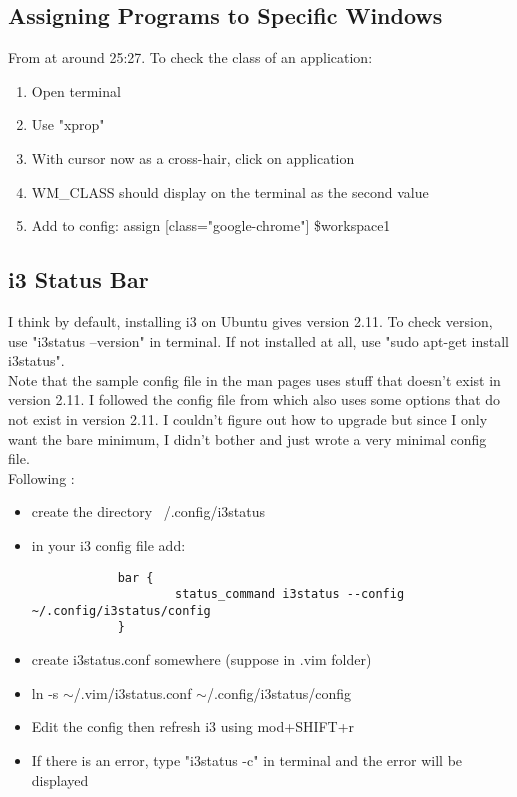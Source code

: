 \subsection{Assigning Programs to Specific Windows}
From \cite{codecast2015i3wm} at around 25:27.
To check the class of an application:
\begin{enumerate}
    \item Open terminal
    \item Use "xprop"
    \item With cursor now as a cross-hair, click on application
    \item WM\_CLASS should display on the terminal as the second value
    \item Add to config:
        assign [class="google-chrome"] \$workspace1
\end{enumerate}

\subsection{i3 Status Bar}
I think by default, installing i3 on Ubuntu gives version 2.11. To check
version, use "i3status --version" in terminal. If not installed at all, use
"sudo apt-get install i3status".\\

Note that the sample config file in the man pages uses stuff that doesn't exist
in version 2.11. I followed the config file \cite{sampaioveiga2020i3status} from
\cite{sampaioveiga2020i3medium} which also uses some options that do not exist
in version 2.11. I couldn't figure out how to upgrade but since I only want the
bare minimum, I didn't bother and just wrote a very minimal config file.\\

Following \cite{stapelberg2015i3status}:
\begin{itemize}
    \item create the directory ~/.config/i3status
    \item in your i3 config file add:
        \begin{lstlisting}
            bar {
                    status_command i3status --config ~/.config/i3status/config
            }
        \end{lstlisting}
    \item create i3status.conf somewhere (suppose in .vim folder)
    \item ln -s $\sim$/.vim/i3status.conf $\sim$/.config/i3status/config
    \item Edit the config then refresh i3 using mod+SHIFT+r
    \item If there is an error, type "i3status -c" in terminal and the error will be displayed
\end{itemize}

